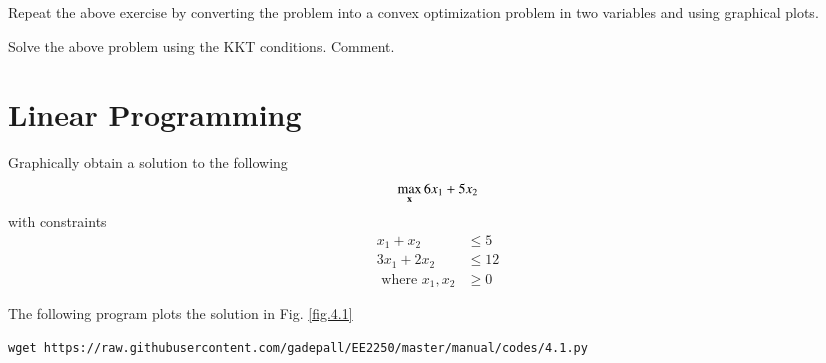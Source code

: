 \documentclass[journal,12pt,twocolumn]{IEEEtran}
\newcommand\bigzero{\makebox(0,0){\text{\huge0}}}
\begin{document}
\begin{problem}
	Repeat the above exercise by converting the problem into a convex optimization problem in two variables and using graphical plots.  
\end{problem}
\begin{problem}
	Solve the above problem using the KKT conditions.  Comment.
\end{problem}
	
\section{Linear Programming}
	
	


\begin{problem}
\label{ch1_lp1}
	Graphically obtain a solution to the following 
	\begin{align}
\max_{\mathbf{x}}	6x_1 + 5x_2
	\end{align}
	with constraints
	\begin{align}
	x_1 + x_2 &\leq 5\\
	3x_1 + 2x_2 &\leq 12\\
	\text{ where } x_1,x_2 &\geq 0
	\end{align}
\end{problem}
%
\solution
The following program plots the solution in Fig. \ref{fig.4.1}
%	
\begin{lstlisting}
wget https://raw.githubusercontent.com/gadepall/EE2250/master/manual/codes/4.1.py
\end{lstlisting}
\end{document}
